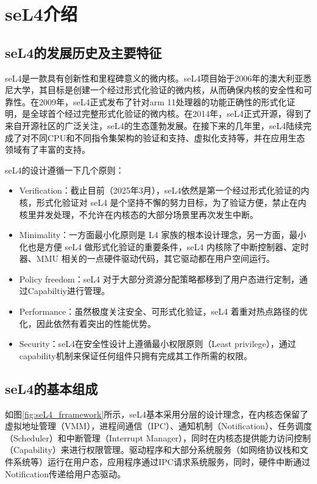 \chapter{seL4介绍}
\label{chap:seL4_intro}
\section{seL4的发展历史及主要特征}
seL4是一款具有创新性和里程碑意义的微内核。seL4项目始于2006年的澳大利亚悉尼大学，其目标是创建一个经过形式化验证的微内核，从而确保内核的安全性和可靠性。在2009年，seL4正式发布了针对arm 11处理器的功能正确性的形式化证明，是全球首个经过完整形式化验证的微内核。在2014年，seL4正式开源，得到了来自开源社区的广泛关注，seL4的生态蓬勃发展。在接下来的几年里，seL4陆续完成了对不同CPU和不同指令集架构的验证和支持、虚拟化支持等，并在应用生态领域有了丰富的支持。

seL4的设计遵循一下几个原则\cite{sel4DesignPrinciples}： 
\begin{itemize}
  \item Verification：截止目前（2025年3月），seL4依然是第一个经过形式化验证的内核，形式化验证对 seL4 是个坚持不懈的努力目标，为了验证方便，禁止在内核里并发处理，不允许在内核态的大部分场景里再次发生中断。
  \item Minimality：一方面最小化原则是 L4 家族的根本设计理念，另一方面，最小化也是方便 seL4 做形式化验证的重要条件，seL4 内核除了中断控制器、定时器、MMU 相关的一点硬件驱动代码，其它驱动都在用户空间运行。
  \item Policy freedom：seL4 对于大部分资源分配策略都移到了用户态进行定制，通过Capabiltiy进行管理。
  \item Performance：虽然极度关注安全、可形式化验证，seL4 着重对热点路径的优化，因此依然有着突出的性能优势。
  \item Security：seL4在安全性设计上遵循最小权限原则（Least privilege），通过capability机制来保证任何组件只拥有完成其工作所需的权限。
\end{itemize}

\section{seL4的基本组成}

如图\ref{fig:seL4_frramework}所示，seL4基本采用分层的设计理念，在内核态保留了虚拟地址管理（VMM），进程间通信（IPC）、通知机制（Notification）、任务调度（Scheduler）和中断管理（Interrupt Manager），同时在内核态提供能力访问控制（Capability）来进行权限管理。驱动程序和大部分系统服务（如网络协议栈和文件系统等）运行在用户态，应用程序通过IPC请求系统服务，同时，硬件中断通过Notification传递给用户态驱动。

